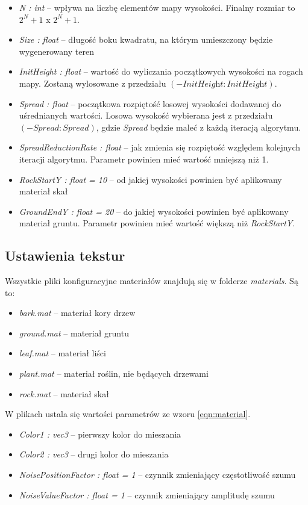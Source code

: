 \documentclass[inz,shortabstract]{iithesis}
\begin{document}
        \begin{itemize}
            \item \textit{N : int} -- wpływa na liczbę elementów mapy wysokości. Finalny rozmiar to $2^N+1$ x $2^N+1$.
            \item \textit{Size : float} -- długość boku kwadratu, na którym umieszczony będzie wygenerowany teren 
            \item \textit{InitHeight : float} -- wartość do wyliczania początkowych wysokości na rogach mapy. Zostaną wylosowane z przedziału $(-\textit{InitHeight}:\textit{InitHeight})$.
            \item \textit{Spread : float} -- początkowa rozpiętość losowej wysokości dodawanej do uśrednianych wartości. Losowa wysokość wybierana jest z przedziału $(-\textit{Spread}:\textit{Spread})$, gdzie \textit{Spread} będzie maleć z każdą iteracją algorytmu.
            \item \textit{SpreadReductionRate : float} -- jak zmienia się rozpiętość względem kolejnych iteracji algorytmu. Parametr powinien mieć wartość mniejszą niż 1. 
            \item \textit{RockStartY : float = 10} -- od jakiej wysokości powinien być aplikowany materiał skał
            \item \textit{GroundEndY : float = 20} -- do jakiej wysokości powinien być aplikowany materiał gruntu. Parametr powinien mieć wartość większą niż \textit{RockStartY}. 
        \end{itemize}
        
        \subsection{Ustawienia tekstur}
        Wszystkie pliki konfiguracyjne materiałów znajdują się w folderze \textit{materials}. Są to:
        \begin{itemize}
            \item \textit{bark.mat} -- materiał kory drzew
            \item \textit{ground.mat} -- materiał gruntu
            \item \textit{leaf.mat} -- materiał liści
            \item \textit{plant.mat} -- materiał roślin, nie będących drzewami
            \item \textit{rock.mat} -- materiał skał
        \end{itemize}
        
        W plikach ustala się wartości parametrów ze wzoru \ref{eqn:material}. 
        \begin{itemize}
            \item \textit{Color1 : vec3} -- pierwszy kolor do mieszania
            \item \textit{Color2 : vec3} -- drugi kolor do mieszania
            \item \textit{NoisePositionFactor : float = 1} -- czynnik zmieniający częstotliwość szumu 
            \item \textit{NoiseValueFactor : float = 1} -- czynnik zmieniający amplitudę szumu
        \end{itemize}
        
\end{document}
